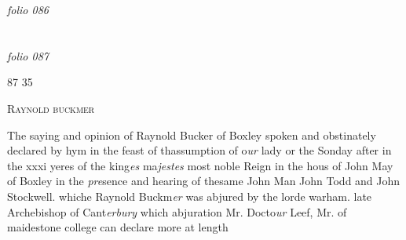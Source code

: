 \documentclass[12pt, a4paper]{book}
\begin{document}
            
\dotfill
					

\textit{folio 086}


         \vspace{4cm}
         
\dotfill
					  \section*{}

\textit{folio 087}



\begin{flushright}{\color{Mahogany}87} 35\end{flushright}
 

               
				\begin{center} \begin{large} {\scshape Raynold buckmer} \end{large} \end{center}
			
	
		
				\marginpar[\vspace{0.5cm}{\textcolor{Gray}{n}}]{}
			
		
		\ifthenelse{\isodd{\thepage}}
		{\reversemarginpar}
		{\normalmarginpar}
		The saying and opinion of Raynold Bucker of
 Boxley spoken and obstinately declared by
 hym in the feast of thassumption of o\textit{ur} lady
 or the Sonday after in the xxxi yeres
 of the king\textit{es} ma\textit{jestes} most noble Reign in the
 	hous of John May of Boxley in the \textit{pre}sence
			and hearing of thesame John Man John
				Todd and John Stockwell. whiche
			Raynold Buckm\textit{er} was abjured by the
			lorde warham. late Archebishop of Cant\textit{erbury}
			which abjuration Mr. Docto\textit{ur} Leef, Mr.
 of maidestone college can declare more
 at length
 
 	
				\marginpar[\vspace{0.5cm}{\textcolor{Gray}{vi articles}}]{}
			
	
				\marginpar[\vspace{0.5cm}{\textcolor{Gray}{n}}]{}
			
	
				\marginpar[\vspace{0.5cm}{\textcolor{Gray}{n}}]{}
			
\end{document}
